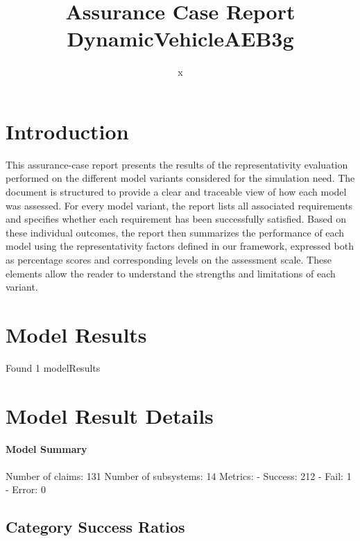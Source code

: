 \documentclass{article}
\title{Assurance Case Report DynamicVehicleAEB3g}
\author{x}
\begin{document}
	\maketitle
	\section{Introduction}
	This assurance-case report presents the results of the 
	representativity evaluation performed on the different model variants considered for 
	the simulation need. The document is structured to provide a clear and traceable view of how 
	each model was assessed. For every model variant, the report lists all associated requirements
	 and specifies whether each requirement has been successfully satisfied. Based on these 
	individual outcomes, the report then summarizes the performance of each model using the 
	representativity factors defined in our framework, expressed both as percentage scores 
	and corresponding levels on the assessment scale. These elements allow the reader to understand 
	the strengths and limitations of each variant.
	 
	\section{Model Results}
    Found 1 modelResults
		
			\section{Model Result Details} 
			\paragraph{Model Summary}
			Number of claims: 131
			Number of subsystems: 14
			Metrics:
			- Success: 212
			- Fail: 1
			- Error: 0
			
	

					\subsection{Category Success Ratios}
						
\end{document}
